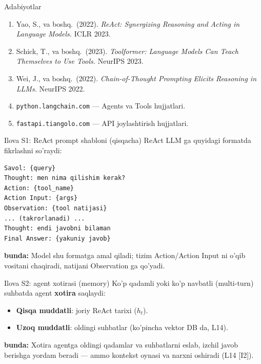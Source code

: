 \documentclass[aspectratio=169,11pt]{beamer}
\newcommand{\bunda}[1]{{\small\textbf{bunda:}\; #1}}
\begin{document}
\begin{frame}{Adabiyotlar}
  \begin{enumerate}\small\setlength\itemsep{5pt}
    \item Yao, S., va boshq.\ (2022). \textit{ReAct: Synergizing Reasoning and
          Acting in Language Models.} ICLR 2023.
    \item Schick, T., va boshq.\ (2023). \textit{Toolformer: Language Models Can
          Teach Themselves to Use Tools.} NeurIPS 2023.
    \item Wei, J., va boshq.\ (2022). \textit{Chain-of-Thought Prompting Elicits
          Reasoning in LLMs.} NeurIPS 2022.
    \item \texttt{python.langchain.com} --- Agents va Tools hujjatlari.
    \item \texttt{fastapi.tiangolo.com} --- API joylashtirish hujjatlari.
  \end{enumerate}
\end{frame}

\appendix

\begin{frame}[fragile]{Ilova S1: ReAct prompt shabloni (qisqacha)}
  \small
  ReAct LLM ga quyidagi formatda fikrlashni so'raydi:
\begin{lstlisting}
Savol: {query}
Thought: men nima qilishim kerak?
Action: {tool_name}
Action Input: {args}
Observation: {tool natijasi}
... (takrorlanadi) ...
Thought: endi javobni bilaman
Final Answer: {yakuniy javob}
\end{lstlisting}
  \bunda{Model shu formatga amal qiladi; tizim Action/Action Input ni o'qib
  vositani chaqiradi, natijani Observation ga qo'yadi.}
\end{frame}

\begin{frame}{Ilova S2: agent xotirasi (memory)}
  \small
  Ko'p qadamli yoki ko'p navbatli (multi-turn) suhbatda agent \textbf{xotira}
  saqlaydi:
  \begin{itemize}\setlength\itemsep{2pt}
    \item \textbf{Qisqa muddatli}: joriy ReAct tarixi ($h_t$).
    \item \textbf{Uzoq muddatli}: oldingi suhbatlar (ko'pincha vektor DB da, L14).
  \end{itemize}
  \bunda{Xotira agentga oldingi qadamlar va suhbatlarni eslab, izchil javob
  berishga yordam beradi --- ammo kontekst oynasi va narxni oshiradi (L14 [I2]).}
\end{frame}
\end{document}

